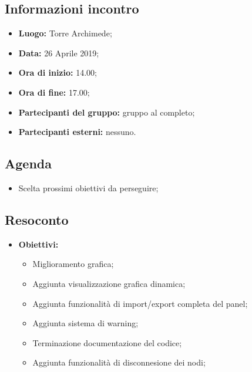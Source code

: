 \subsection{Informazioni incontro}
\begin{itemize}
	\item { \textbf{Luogo:} Torre Archimede};
	\item { \textbf{Data:} 26 Aprile 2019};
	\item { \textbf{Ora di inizio:} 14.00};
	\item { \textbf{Ora di fine:} 17.00};
	\item { \textbf{Partecipanti del gruppo:} gruppo al completo};
	\item { \textbf{Partecipanti esterni:} nessuno}.
\end{itemize}


\subsection{Agenda}
\begin{itemize}
	\item {Scelta prossimi obiettivi da perseguire;}
\end{itemize}

\subsection{Resoconto}
\begin{itemize}
	\item { \textbf{Obiettivi:}
	\begin{itemize}
		\item Miglioramento grafica;
		\item Aggiunta visualizzazione grafica dinamica;
		\item Aggiunta funzionalità di import/export completa del panel;
		\item Aggiunta sistema di warning;
		\item Terminazione documentazione del codice;
		\item Aggiunta funzionalità di disconnesione dei nodi;
	\end{itemize}}	
\end{itemize}

